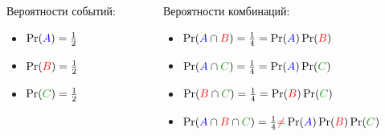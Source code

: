 \documentclass[hyperref=unicode,graphics=pdflatex,13pt,xcolor={usenames,dvipsnames}]{beamer}
\newcommand\hl[1]{{\color{blue}{#1}}}
\newcommand\red[1]{{\color{red}{#1}}}
\newcommand\green[1]{{\color{green!50!darkgray}{#1}}}
\begin{document}
\begin{frame}
  \begin{columns}
    \begin{column}{0.3\textwidth}
      Вероятности событий:
      \begin{itemize}
        \item $\Pr(\hl{A}) = \frac{1}{2}$
        \item $\Pr(\red{B}) = \frac{1}{2}$
        \item $\Pr(\green{C}) = \frac{1}{2}$
      \end{itemize}
      \vspace{2.5em}
    \end{column}
    \begin{column}{0.7\textwidth}
      Вероятности комбинаций:
      \begin{itemize}
        \item $\Pr(\hl{A} \cap \red{B}) = \frac{1}{4} = \Pr(\hl{A}) \Pr(\red{B})$
        \item $\Pr(\hl{A} \cap \green{C}) = \frac{1}{4} = \Pr(\hl{A}) \Pr(\green{C})$
        \item $\Pr(\red{B} \cap \green{C}) = \frac{1}{4} = \Pr(\red{B}) \Pr(\green{C})$
        \item $\Pr(\hl{A} \cap \red{B} \cap \green{C}) = \frac{1}{4} \red{\ne} \Pr(\hl{A}) \Pr(\red{B}) \Pr(\green{C})$ 
      \end{itemize}
    \end{column}
  \end{columns}

\end{frame}
\end{document}
